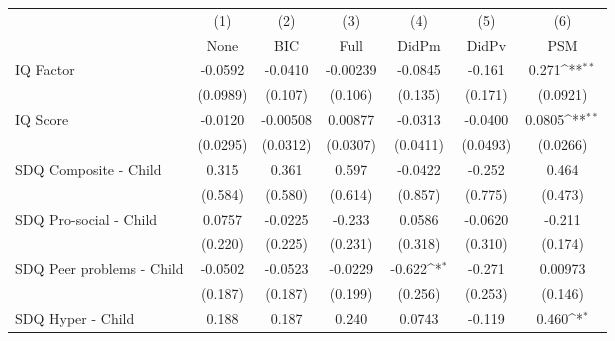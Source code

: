 {
\def\sym#1{\ifmmode^{#1}\else\(^{#1}\)\fi}
\begin{tabular}{l*{6}{c}}
\toprule
            &\multicolumn{1}{c}{(1)}&\multicolumn{1}{c}{(2)}&\multicolumn{1}{c}{(3)}&\multicolumn{1}{c}{(4)}&\multicolumn{1}{c}{(5)}&\multicolumn{1}{c}{(6)}\\
            &\multicolumn{1}{c}{None}&\multicolumn{1}{c}{BIC}&\multicolumn{1}{c}{Full}&\multicolumn{1}{c}{DidPm}&\multicolumn{1}{c}{DidPv}&\multicolumn{1}{c}{PSM}\\
\midrule
IQ Factor   &     -0.0592         &     -0.0410         &    -0.00239         &     -0.0845         &      -0.161         &       0.271\sym{**} \\
            &    (0.0989)         &     (0.107)         &     (0.106)         &     (0.135)         &     (0.171)         &    (0.0921)         \\
\addlinespace
IQ Score    &     -0.0120         &    -0.00508         &     0.00877         &     -0.0313         &     -0.0400         &      0.0805\sym{**} \\
            &    (0.0295)         &    (0.0312)         &    (0.0307)         &    (0.0411)         &    (0.0493)         &    (0.0266)         \\
\addlinespace
SDQ Composite - Child&       0.315         &       0.361         &       0.597         &     -0.0422         &      -0.252         &       0.464         \\
            &     (0.584)         &     (0.580)         &     (0.614)         &     (0.857)         &     (0.775)         &     (0.473)         \\
\addlinespace
SDQ Pro-social - Child&      0.0757         &     -0.0225         &      -0.233         &      0.0586         &     -0.0620         &      -0.211         \\
            &     (0.220)         &     (0.225)         &     (0.231)         &     (0.318)         &     (0.310)         &     (0.174)         \\
\addlinespace
SDQ Peer problems - Child&     -0.0502         &     -0.0523         &     -0.0229         &      -0.622\sym{*}  &      -0.271         &     0.00973         \\
            &     (0.187)         &     (0.187)         &     (0.199)         &     (0.256)         &     (0.253)         &     (0.146)         \\
\addlinespace
SDQ Hyper - Child&       0.188         &       0.187         &       0.240         &      0.0743         &      -0.119         &       0.460\sym{*}  \\

\end{tabular}}
